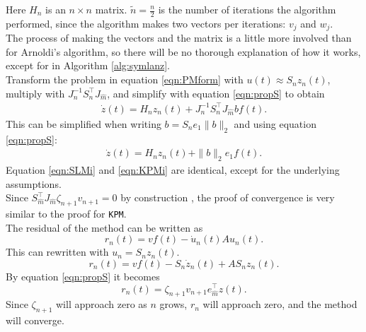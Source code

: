 \noindent Here $H_n$ is an $ n \times n $ matrix. $ \tilde{n} = \frac{n}{2}$ is the number of iterations the algorithm performed, since the algorithm makes two vectors per iterations: $v_j$ and $w_j$. \\

\noindent The process of making the vectors and the matrix is a little more involved than for Arnoldi's algorithm, so there will be no thorough explanation of how it works, except for in Algorithm \ref{alg:symlanz}.\\

\noindent Transform the problem in equation \eqref{eqn:PMform} with $u(t) \approx S_n z_n(t)$, multiply with $J^{-1}_n S_n^\top J_{ \hat{m} }$, and simplify with equation \eqref{eqn:propS} to obtain
\begin{equation*}
\begin{aligned}
\dot{z}(t) = H_n z_n(t) + J_n^{-1} S_n^\top J_{\hat{m}} b f(t).
\end{aligned}
\end{equation*}
This can be simplified when writing $ b = S_n e_1 \| b \|_2 $ and using equation \eqref{eqn:propS}:
\begin{equation}
\begin{aligned}
\dot{z}(t) = H_n z_n(t) + \|b \|_2 e_1 f(t).
\end{aligned}
\label{eqn:SLMi}
\end{equation}
Equation \eqref{eqn:SLMi} and \eqref{eqn:KPMi} are identical, except for the underlying assumptions. \\

\noindent Since $ S_{\hat{m}}^\top J_{\hat{m}} \zeta_{n+1} v_{n+1} = 0 $ by construction \cite{SLMconv}, the proof of convergence is very similar to the proof for \texttt{KPM}.\\
The residual of the method can be written as
\begin{equation*}
r_n(t) = v f(t) - \dot{u}_n(t) A u_n(t).
\end{equation*}
This can rewritten with $u_n = S_n z_n(t)$.
\begin{equation*}
r_n(t) = v f(t) -S_n \dot{z}_n(t) + A S_n z_n(t).
\end{equation*}
By equation \eqref{eqn:propS} it becomes
\begin{equation*}
r_n(t) =  \zeta_{n+1} v_{n+1} e_{\hat{m}}^\top z(t).
\end{equation*}
Since $\zeta_{n+1}$ will approach zero as $n$ grows, $r_n$ will approach zero, and the method will converge. \\

